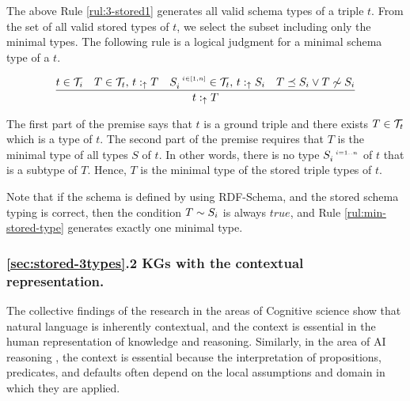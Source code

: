 \documentclass[runningheads]{llncs}
\newcommand{\s}{\scriptscriptstyle\ \,}
\newcommand{\uarr}{\uparrow}
\newcommand{\T}{{\cal T}}
\newcommand{\memo}[1]{}
\begin{document}
The above Rule \ref{rul:3-stored1} generates all valid schema types of
a triple $t$. From the set of all valid stored types of $t$, we select
the subset including only the minimal types. The following rule is a
logical judgment for a minimal schema type of a $t$. 

\begin{equation}
\label{rul:min-stored-type}
\dfrac{t\in\T_i\quad T\in\T_t,\, t:_\uarr\/T\quad\/S_i^{\s\/i\in[1,n]}\in\T_t,\, t:_\uarr\/S_i\quad T\preceq\/S_i\lor\/T\not\sim\/S_i}
      {t:_{\uarr}\/T}
\end{equation}

The first part of the premise says that $t$ is a ground triple and there
exists $T\in\T_t$ which is a type of $t$. The second part of the premise
requires that $T$ is the minimal type of all types $S$ of $t$. In
other words, there is no type $S_i^{\s\/i=1..n}$ of $t$ that is a
subtype of $T$. Hence, $T$ is the minimal type of the stored triple
types of $t$.

Note that if the schema is defined by using RDF-Schema, and the stored
schema typing is correct, then the condition $T\sim\/S_i$ is always
$true$, and Rule \ref{rul:min-stored-type} generates exactly one
minimal type.

\memo{
Furthermore, under the restrictions of RDF-Schema, we can
not define a predicate $p$ with two meanings. If we were to specify two
different domains or ranges of $p$, then the reasoner would treat the
domain and range types as $\land$-types. Each instance of the domain
(range) type has to be an instance of all specified types of the
domain (range).}

% 



\subsubsection{\ref{sec:stored-3types}.2 KGs with the contextual representation.}

The collective findings of the research in the areas of Cognitive
science \cite{Stenning2008,Hollister2017} show that natural language
is inherently contextual, and the context is essential in the human
representation of knowledge and reasoning. Similarly, in the area of
AI reasoning \cite{McCarthy1993,Ghidini2001,Brewka2007}, the context
is essential because the interpretation of propositions, predicates,
and defaults often depend on the local assumptions and domain in which
they are applied.
\end{document}
